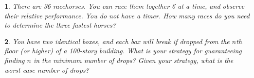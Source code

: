 \documentclass{report}
\newtheorem{problem}{}
\numberwithin{problem}{chapter} %
\begin{document}
\begin{problem}
There are 36 racehorses. You can race them together 6 at a time, and observe their relative performance. You do not have a timer. How many races do you need to determine the three fastest horses?
\end{problem}

\begin{problem}
You  have two identical boxes, and each box will break if dropped from the $n$th floor (or higher) of a 100-story building. What is your strategy for guaranteeing finding $n$ in the minimum number of drops? Given your strategy, what is the worst case number of drops?
\end{problem}

\printbibliography
\end{document}
